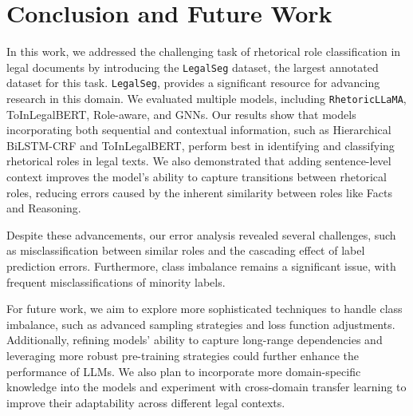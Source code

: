 \section{Conclusion and Future Work}
In this work, we addressed the challenging task of rhetorical role classification in legal documents by introducing the \texttt{LegalSeg} dataset, the largest annotated dataset for this task. \texttt{LegalSeg}, provides a significant resource for advancing research in this domain. We evaluated multiple models, including \texttt{RhetoricLLaMA}, ToInLegalBERT, Role-aware, and GNNs. Our results show that models incorporating both sequential and contextual information, such as Hierarchical BiLSTM-CRF and ToInLegalBERT, perform best in identifying and classifying rhetorical roles in legal texts. We also demonstrated that adding sentence-level context improves the model's ability to capture transitions between rhetorical roles, reducing errors caused by the inherent similarity between roles like Facts and Reasoning.

Despite these advancements, our error analysis revealed several challenges, such as misclassification between similar roles and the cascading effect of label prediction errors. Furthermore, class imbalance remains a significant issue, with frequent misclassifications of minority labels.

For future work, we aim to explore more sophisticated techniques to handle class imbalance, such as advanced sampling strategies and loss function adjustments. Additionally, refining models' ability to capture long-range dependencies and leveraging more robust pre-training strategies could further enhance the performance of LLMs. We also plan to incorporate more domain-specific knowledge into the models and experiment with cross-domain transfer learning to improve their adaptability across different legal contexts. 
